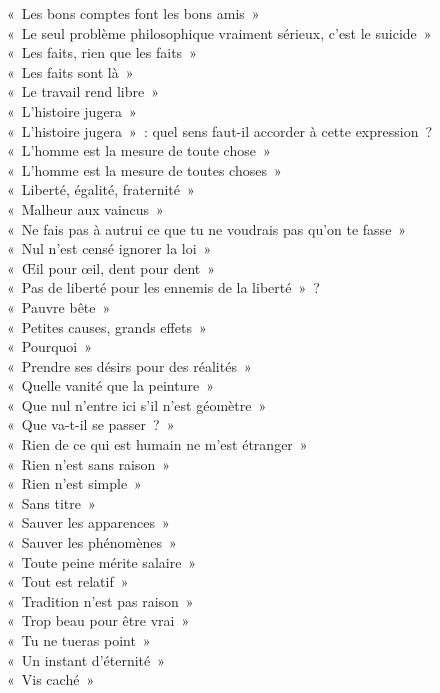 \documentclass[a4paper,12pt]{article}
\begin{document}
« Les bons comptes font les bons amis » \\
« Le seul problème philosophique vraiment sérieux, c'est le suicide » \\
« Les faits, rien que les faits » \\
« Les faits sont là » \\
« Le travail rend libre » \\
« L'histoire jugera » \\
« L'histoire jugera » : quel sens faut-il accorder à cette expression ? \\
« L'homme est la mesure de toute chose » \\
« L'homme est la mesure de toutes choses » \\
« Liberté, égalité, fraternité » \\
« Malheur aux vaincus » \\
« Ne fais pas à autrui ce que tu ne voudrais pas qu'on te fasse » \\
« Nul n'est censé ignorer la loi » \\
« Œil pour œil, dent pour dent » \\
« Pas de liberté pour les ennemis de la liberté » ? \\
« Pauvre bête » \\
« Petites causes, grands effets » \\
« Pourquoi » \\
« Prendre ses désirs pour des réalités » \\
« Quelle vanité que la peinture » \\
« Que nul n'entre ici s'il n'est géomètre » \\
« Que va-t-il se passer ? » \\
« Rien de ce qui est humain ne m'est étranger » \\
« Rien n'est sans raison » \\
« Rien n'est simple » \\
« Sans titre » \\
« Sauver les apparences » \\
« Sauver les phénomènes » \\
« Toute peine mérite salaire » \\
« Tout est relatif » \\
« Tradition n'est pas raison » \\
« Trop beau pour être vrai » \\
« Tu ne tueras point » \\
« Un instant d'éternité » \\
« Vis caché » 
\end{document}
